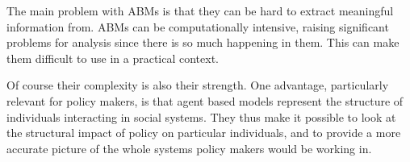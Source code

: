 The main problem with ABMs is that they can be hard to extract meaningful information from. ABMs can be computationally intensive, raising significant problems for analysis since there is so much happening in them. This can make them difficult to use in a practical context. %
% 

Of course their complexity is also their strength. %
One advantage, particularly relevant for policy makers, is that agent based models represent the structure of individuals interacting in social systems. %
They thus make it possible to look at the structural impact of policy on particular individuals, and to provide a more accurate picture of the whole systems policy makers would be working in.




%
%
%
%
%
%

